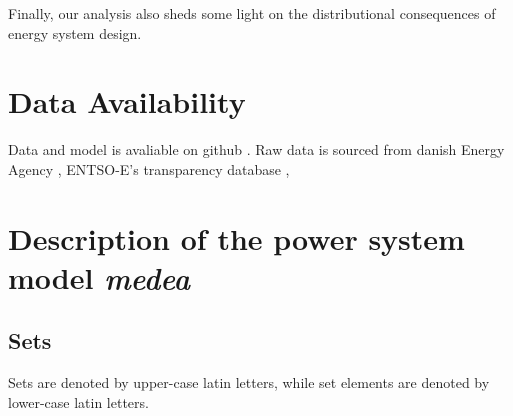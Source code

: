 \documentclass[final, 3p, times]{elsarticle} %
\begin{document}
    Finally, our analysis also sheds some light on the distributional consequences of energy system design.


    \section{Data Availability}\label{sec:data-availability}
    Data and model is avaliable on github \url{}. Raw data is sourced from danish Energy Agency \url{}, ENTSO-E's
    transparency database \url{},

    \newpage
    
    

    \newpage
    \appendix


    \section{Description of the power system model \emph{medea}} \label{sec:medea}

    \subsection{Sets} \label{sets}
    Sets are denoted by upper-case latin letters, while set elements are denoted by lower-case latin letters.
\end{document}
